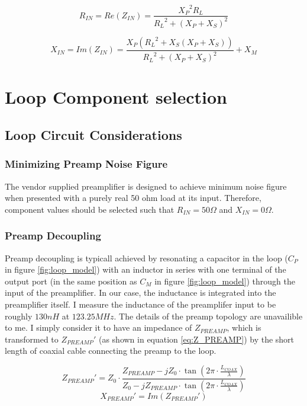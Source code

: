 \begin{equation} \label{eq:R_IN}
    R_{IN}=Re(Z_{IN})=\frac{{X_P}^2 R_L}{{R_L}^2+(X_P+X_S)^2}
\end{equation}

\begin{equation} \label{eq:X_IN}
    X_{IN}= Im(Z_{IN}) = \frac{X_P ({R_L}^2 + X_S(X_P+X_S))}{{R_L}^2+(X_P+X_S)^2}+X_M
\end{equation}

\section{Loop Component selection}

\subsection{Loop Circuit Considerations}
\subsubsection{Minimizing Preamp Noise Figure}
The vendor supplied preamplifier is designed to achieve minimum noise figure when presented with a purely real 50 ohm 
load at its input. Therefore, component values should be selected such that $R_{IN}=50\Omega$ and $X_{IN}=0\Omega$.
\subsubsection{Preamp Decoupling}
Preamp decoupling is typicall achieved by resonating a capacitor in the loop ($C_P$ in figure \ref{fig:loop_model}) with
an inductor in series with one terminal of the output port (in the same position as $C_M$ in figure
\ref{fig:loop_model}) through the input of the preamplifier. In our case, the inductance is integrated into the
preamplifier itself. I measure the inductance of the preamplifer input to be roughly $130nH$ at $123.25 MHz$. The
details of the preamp topology are unavailible to me. I simply consider it to have an impedance of $Z_{PREAMP}$, which
is transformed to ${Z_{PREAMP}}'$ (as shown in equation \ref{eq:Z_PREAMP}) by the short length of coaxial cable
connecting the preamp to the loop.

\begin{equation} \label{eq:Z_PREAMP}
    {Z_{PREAMP}}'=Z_0 \cdot \frac{Z_{PREAMP}-j Z_0 \cdot \tan(2\pi\cdot\frac{L_{COAX}}{\lambda})}{Z_0 - j Z_{PREAMP} \cdot
    \tan(2\pi\cdot\frac{L_{COAX}}{\lambda})}
\end{equation}
\begin{equation} \label{eq:X_PREAMP}
    {X_{PREAMP}}'=Im({Z_{PREAMP}}')
\end{equation}
    
